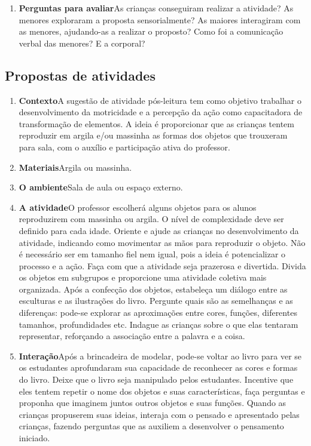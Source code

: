 \documentclass[11pt]{extarticle}
\begin{document}
\begin{enumerate}
\item \textbf{Perguntas para avaliar}\quad As crianças conseguiram realizar a atividade? As menores exploraram a proposta sensorialmente? As maiores interagiram com as menores, ajudando-as a realizar o proposto? Como foi a comunicação verbal das menores? E a corporal? 
\end{enumerate}


\subsection{Propostas de atividades}


\begin{enumerate}
\item \textbf{Contexto}\quad A sugestão de atividade pós-leitura tem como objetivo trabalhar o desenvolvimento da motricidade e a percepção da ação como capacitadora de transformação de elementos. A ideia é proporcionar que as crianças tentem reproduzir em argila e/ou massinha as formas dos objetos que trouxeram para sala, com o auxílio e participação ativa do professor.

\item \textbf{Materiais}\quad Argila ou massinha.

\item \textbf{O ambiente}\quad Sala de aula ou espaço externo.

\item \textbf{A atividade}\quad O professor escolherá alguns objetos para os alunos reproduzirem com massinha ou argila. O nível de complexidade deve ser definido para cada idade. Oriente e ajude as crianças no desenvolvimento da atividade, indicando como movimentar as mãos para reproduzir o objeto. Não é necessário ser em tamanho fiel nem igual, pois a ideia é potencializar o processo e a ação. Faça com que a atividade seja prazerosa e divertida. Divida os objetos em subgrupos e proporcione uma atividade coletiva mais organizada. Após a confecção dos objetos, estabeleça um diálogo entre as esculturas e as ilustrações do livro. Pergunte quais são as semelhanças e as diferenças: pode-se explorar as aproximações entre cores, funções, diferentes tamanhos, profundidades etc. Indague as crianças sobre o que elas tentaram representar, reforçando a associação entre a palavra e a coisa.


\item \textbf{Interação}\quad Após a brincadeira de modelar, pode-se voltar ao livro para ver se os estudantes aprofundaram sua capacidade de reconhecer as cores e formas do livro.
Deixe que o livro seja manipulado pelos estudantes. Incentive que eles tentem repetir o nome dos objetos e suas características,
faça perguntas e proponha que imaginem juntos outros objetos e suas funções.
Quando as crianças propuserem suas ideias, interaja com o pensado e apresentado pelas crianças, fazendo perguntas que as auxiliem a desenvolver o pensamento iniciado.


\end{enumerate}
\end{document}

